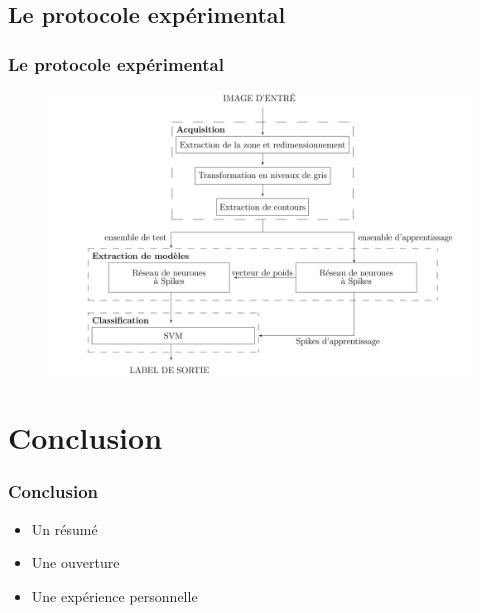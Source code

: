 \documentclass{beamer}
\begin{document}
\subsection{Le protocole expérimental}
\begin{frame}
  \frametitle{Le protocole expérimental}
  \begin{figure}
    \centering
    \includegraphics[scale=0.13]{image/archi.png}
  \end{figure}
\end{frame}


\section{Conclusion}
\begin{frame}
  \frametitle{Conclusion}
  \centering
  \begin{itemize}
  \item Un résumé
  \item Une ouverture
  \item Une expérience personnelle
  \end{itemize}
\end{frame}

\end{document}
